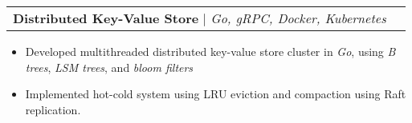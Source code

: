 \documentclass[letterpaper,11pt]{article}
\makeatletter
\newcommand{\resumeItem}[1]{
  \item\small{
    {#1 \vspace{-2pt}}
  }
}
\newcommand{\resumeProjectHeading}[2]{
    \item
    \begin{tabular*}{0.97\textwidth}{l@{\extracolsep{\fill}}r}
      \small#1 & #2 \\
    \end{tabular*}\vspace{-7pt}
}
\newcommand{\resumeItemListStart}{\begin{itemize}}
\newcommand{\resumeItemListEnd}{\end{itemize}\vspace{-5pt}}
\makeatother
\begin{document}
        \resumeProjectHeading
          {\textbf{Distributed Key-Value Store} $|$ \emph{Go, gRPC, Docker, Kubernetes}}{}
          \resumeItemListStart
            \resumeItem{Developed multithreaded distributed key-value store cluster in \textit{Go}, using \textit{B trees}, \textit{LSM trees}, and \textit{bloom filters}}
            \resumeItem{Implemented hot-cold system using LRU eviction and compaction using Raft replication. }
          \resumeItemListEnd

        




\end{document}
